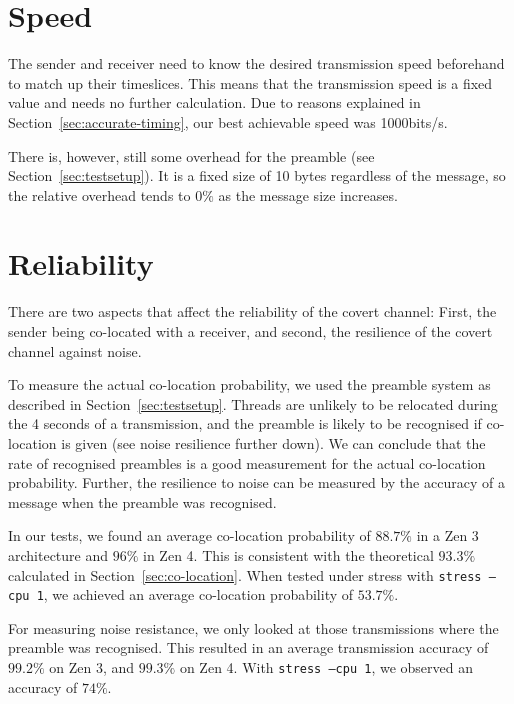 \documentclass[11pt,
  titlepage=false,
]{scrreprt}
\begin{document}
\section{Speed}
The sender and receiver need to know the desired transmission speed beforehand to match up their timeslices.
This means that the transmission speed is a fixed value and needs no further calculation.
Due to reasons explained in Section~\ref{sec:accurate-timing}, our best achievable speed was 1000bits/s.

There is, however, still some overhead for the preamble (see Section~\ref{sec:testsetup}).
It is a fixed size of 10 bytes regardless of the message,
so the relative overhead tends to $0\%$ as the message size increases.

\section{Reliability}
There are two aspects that affect the reliability of the covert channel:
First, the sender being co-located with a receiver, and second, the resilience of the covert channel against noise.

To measure the actual co-location probability, we used the preamble system as described in Section~\ref{sec:testsetup}.
Threads are unlikely to be relocated during the 4 seconds of a transmission,
and the preamble is likely to be recognised if co-location is given (see noise resilience further down).
We can conclude that the rate of recognised preambles is a good measurement for the actual co-location probability.
Further, the resilience to noise can be measured by the accuracy of a message when the preamble was recognised.

In our tests, we found an average co-location probability of $88.7\%$ in a Zen 3 architecture and $96\%$ in Zen 4.
This is consistent with the theoretical $93.3\%$ calculated in Section~\ref{sec:co-location}.
When tested under stress with \texttt{stress --cpu 1}, we achieved an average co-location probability of $53.7\%$.

For measuring noise resistance, we only looked at those transmissions where the preamble was recognised.
This resulted in an average transmission accuracy of $99.2\%$ on Zen 3, and $99.3\%$ on Zen 4.
With \texttt{stress --cpu 1}, we observed an accuracy of $74\%$.


\end{document}
